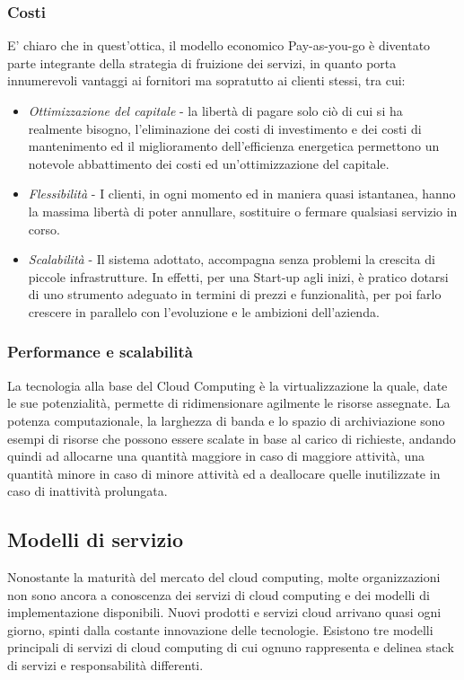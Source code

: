 \subsubsection{Costi}
E' chiaro che in quest'ottica, il modello economico Pay-as-you-go è diventato parte integrante della strategia di fruizione dei servizi, in quanto porta innumerevoli vantaggi ai fornitori ma sopratutto ai clienti stessi, tra cui:
    \begin{itemize}
    \item \textit{Ottimizzazione del capitale} - la libertà di pagare solo ciò di cui si ha realmente bisogno, l'eliminazione dei costi di investimento e dei costi di mantenimento ed il miglioramento dell'efficienza energetica permettono un notevole abbattimento dei costi ed un'ottimizzazione del capitale.
    \item \textit{Flessibilità} - I clienti, in ogni momento ed in maniera quasi istantanea, hanno la massima libertà di poter annullare, sostituire o fermare qualsiasi servizio in corso.
    \item \textit{Scalabilità} - Il sistema adottato, accompagna senza problemi la crescita di piccole infrastrutture. In effetti, per una Start-up agli inizi, è pratico dotarsi di uno strumento adeguato in termini di prezzi e funzionalità, per poi farlo crescere in parallelo con l'evoluzione e le ambizioni dell'azienda.
    \end{itemize}

\subsubsection{Performance e scalabilità}
La tecnologia alla base del Cloud Computing è la virtualizzazione la quale, date le sue potenzialità, permette di ridimensionare agilmente le risorse assegnate. La potenza computazionale, la larghezza di banda e lo spazio di archiviazione sono esempi di risorse che possono essere scalate in base al carico di richieste, andando quindi ad allocarne una quantità maggiore in caso di maggiore attività, una quantità minore in caso di minore attività ed a deallocare quelle inutilizzate in caso di inattività prolungata.

\subsection{Modelli di servizio} %
Nonostante la maturità del mercato del cloud computing, molte organizzazioni non sono ancora a conoscenza dei servizi di cloud computing e dei modelli di implementazione disponibili. Nuovi prodotti e servizi cloud arrivano quasi ogni giorno, spinti dalla costante innovazione delle tecnologie.
Esistono tre modelli principali di servizi di cloud computing di cui ognuno rappresenta e delinea stack di servizi e responsabilità differenti.


